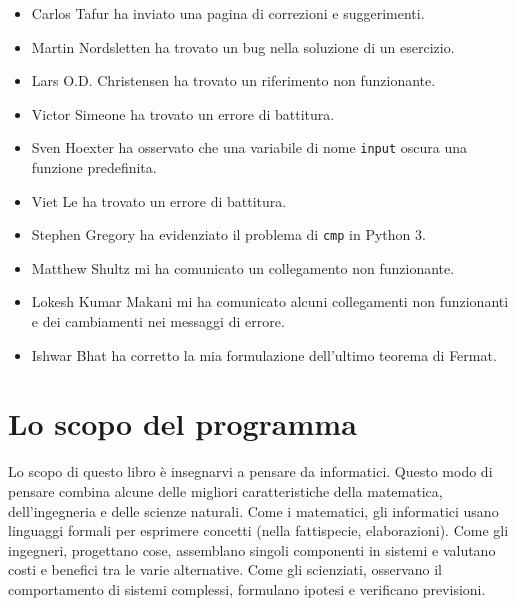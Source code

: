 \documentclass[10pt]{book}
\begin{document}
\begin{itemize}
\item Carlos Tafur ha inviato una pagina di correzioni e suggerimenti.

\item Martin Nordsletten ha trovato un bug nella soluzione di un esercizio.

\item Lars O.D. Christensen ha trovato un riferimento non funzionante.

\item Victor Simeone ha trovato un errore di battitura.

\item Sven Hoexter ha osservato che una variabile di nome {\tt input}
oscura una funzione predefinita.

\item Viet Le ha trovato un errore di battitura.

\item Stephen Gregory ha evidenziato il problema di {\tt cmp} in Python 3.

\item Matthew Shultz mi ha comunicato un collegamento non funzionante.

\item Lokesh Kumar Makani mi ha comunicato alcuni collegamenti non funzionanti e dei cambiamenti nei messaggi di errore.

\item Ishwar Bhat ha corretto la mia formulazione dell'ultimo teorema di Fermat.


\end{itemize}

\normalsize
\clearemptydoublepage

\begin{latexonly}

\tableofcontents

\clearemptydoublepage

\end{latexonly}

\mainmatter

\chapter{Lo scopo del programma}

Lo scopo di questo libro è insegnarvi a pensare da informatici. Questo modo di pensare combina alcune delle migliori caratteristiche della matematica, dell'ingegneria e delle scienze naturali. Come i matematici, gli informatici usano linguaggi formali per esprimere concetti (nella fattispecie, elaborazioni). Come gli ingegneri, progettano cose, assemblano singoli componenti in sistemi e valutano costi e benefici tra le varie alternative. Come gli scienziati, osservano il comportamento di sistemi complessi, formulano ipotesi e verificano previsioni.
\end{document}
